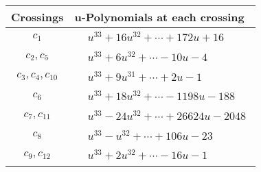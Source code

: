 \documentclass[1p]{elsarticle_modified}
\theoremstyle{definition}
\begin{document}
\begin{tabular}{m{50pt}|m{274pt}}
Crossings & \hspace{64pt}u-Polynomials at each crossing \\
\hline $$\begin{aligned}c_{1}\end{aligned}$$&$\begin{aligned}
&u^{33}+16 u^{32}+\cdots+172 u+16
\end{aligned}$\\
\hline $$\begin{aligned}c_{2},c_{5}\end{aligned}$$&$\begin{aligned}
&u^{33}+6 u^{32}+\cdots-10 u-4
\end{aligned}$\\
\hline $$\begin{aligned}c_{3},c_{4},c_{10}\end{aligned}$$&$\begin{aligned}
&u^{33}+9 u^{31}+\cdots+2 u-1
\end{aligned}$\\
\hline $$\begin{aligned}c_{6}\end{aligned}$$&$\begin{aligned}
&u^{33}+18 u^{32}+\cdots-1198 u-188
\end{aligned}$\\
\hline $$\begin{aligned}c_{7},c_{11}\end{aligned}$$&$\begin{aligned}
&u^{33}-24 u^{32}+\cdots+26624 u-2048
\end{aligned}$\\
\hline $$\begin{aligned}c_{8}\end{aligned}$$&$\begin{aligned}
&u^{33}- u^{32}+\cdots+106 u-23
\end{aligned}$\\
\hline $$\begin{aligned}c_{9},c_{12}\end{aligned}$$&$\begin{aligned}
&u^{33}+2 u^{32}+\cdots-16 u-1
\end{aligned}$\\
\hline
\end{tabular}\\~\\
\newpage\renewcommand{\arraystretch}{1}
\end{document}
